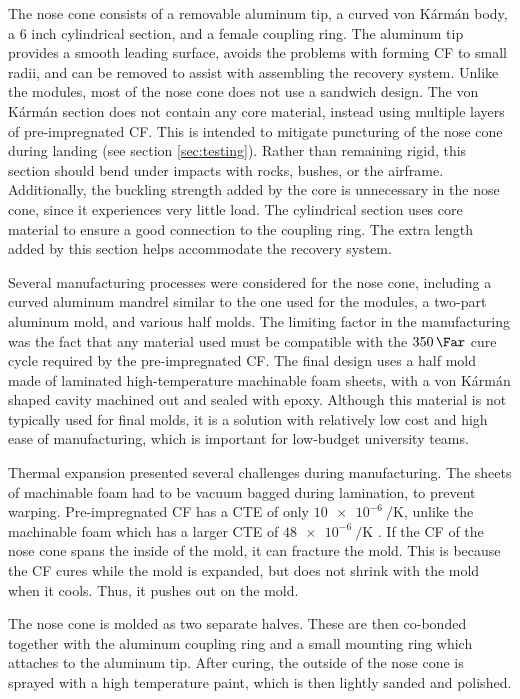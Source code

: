 \documentclass{aiaa-tc}%
\begin{document}
The nose cone consists of a removable aluminum tip, a curved von K\'arm\'an body, a 6 inch cylindrical section, and a female coupling ring. 
The aluminum tip provides a smooth leading surface, avoids the problems with forming CF to small radii, and can be removed to assist with assembling the recovery system. 
Unlike the modules, most of the nose cone does not use a sandwich design.
The von K\'arm\'an section does not contain any core material, instead using multiple layers of pre-impregnated CF. 
This is intended to mitigate puncturing of the nose cone during landing (see section \ref{sec:testing}). 
Rather than remaining rigid, this section should bend under impacts with rocks, bushes, or the airframe. 
Additionally, the buckling strength added by the core is unnecessary in the nose cone, since it experiences very little load.
The cylindrical section uses core material to ensure a good connection to the coupling ring. 
The extra length added by this section helps accommodate the recovery system. 

Several manufacturing processes were considered for the nose cone, including a curved aluminum mandrel similar to the one used for the modules, a two-part aluminum mold, and various half molds. 
The limiting factor in the manufacturing was the fact that any material used must be compatible with the $\SI{350}{\Far}$ cure cycle required by the pre-impregnated CF. 
The final design uses a half mold made of laminated high-temperature machinable foam sheets, with a von K\'arm\'an shaped cavity machined out and sealed with epoxy. 
Although this material is not typically used for final molds, it is a solution with relatively low cost and high ease of manufacturing, which is important for low-budget university teams.

Thermal expansion presented several challenges during manufacturing. 
The sheets of machinable foam had to be vacuum bagged during lamination, to prevent warping.
Pre-impregnated CF has a CTE of only $\SI{10e-6}{\per\kelvin}$, unlike the machinable foam which has a larger CTE of $\SI{48e-6}{\per\kelvin}$ .
If the CF of the nose cone spans the inside of the mold, it can fracture the mold. 
This is because the CF cures while the mold is expanded, but does not shrink with the mold when it cools. Thus, it pushes out on the mold. 

The nose cone is molded as two separate halves. These are then co-bonded together with the aluminum coupling ring and a small mounting ring which attaches to the aluminum tip.
After curing, the outside of the nose cone is sprayed with a high temperature paint, which is then lightly sanded and polished.
\end{document}
